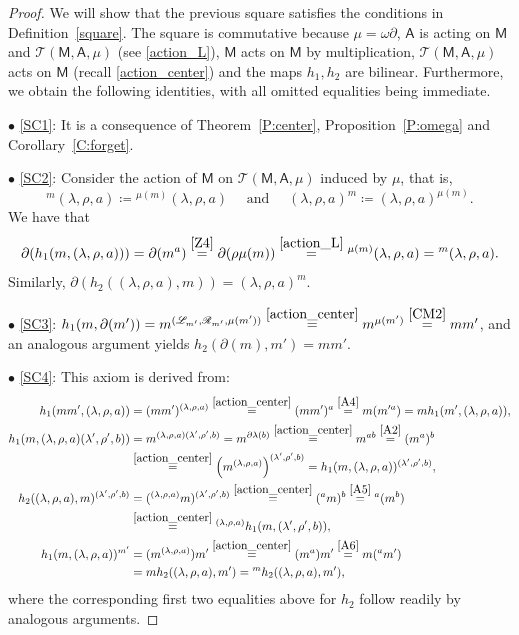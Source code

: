 \documentclass[12pt,reqno]{amsart}
\theoremstyle{plain}
\theoremstyle{definition}
\theoremstyle{remark}
\newcommand{\A}{\ensuremath{\mathsf{A}}}
\newcommand{\MM}{\ensuremath{\mathsf{M}}}
\newcommand{\T}{\ensuremath{\mathcal{T}}}
\newcommand{\LL}{\ensuremath{\mathcal{L}}}
\newcommand{\RR}{\ensuremath{\mathcal{R}}}
\numberwithin{equation}{section}
\begin{document}
\begin{proof}
	We will show that the previous square satisfies the conditions in Definition~\ref{square}.
    The square is commutative because $\mu= \omega \partial$, $\A$ is acting on $\MM$ and $\T(\MM,\A,\mu)$ (see \eqref{action_L}), $\MM$ acts on $\MM$ by multiplication, $\T(\MM,\A,\mu)$ acts on $\MM$ (recall \eqref{action_center}) and the maps $h_1,h_2$ are bilinear. Furthermore, we obtain the following identities, with all omitted equalities being immediate.
    
    $\bullet$ \eqref{SC1}: It is a consequence of Theorem~\ref{P:center}, Proposition~\ref{P:omega} and Corollary~\ref{C:forget}.

$\bullet$ \eqref{SC2}: Consider the action of $\MM$ on $\T(\MM,\A,\mu)$ induced by $\mu$, that is, 
\[{}^{m}(\lambda,\rho,a)\coloneqq{}^{\mu(m)}(\lambda,\rho,a) \quad
\text { and } \quad  (\lambda,\rho,a)^{m}\coloneqq(\lambda,\rho,a)^{\mu(m)}.\] 
    We have that 
		\[\partial(h_1(m,(\lambda,\rho,a)))=\partial(m^a)\stackrel{\eqref{Z4}}{=}\partial(\rho\mu(m))\stackrel{\eqref{action_L}}{=}{}^{\mu(m)}(\lambda,\rho,a)={}^{m}(\lambda,\rho,a).\]
   	Similarly, $\partial(h_2((\lambda,\rho,a),m))=(\lambda,\rho,a)^{m}$.
   	
$\bullet$ \eqref{SC3}: $h_1(m,\partial(m'))=m^{(\LL_{m'},\RR_{m'}, \mu(m'))}\stackrel{\eqref{action_center}}{=}m^{\mu(m')}\stackrel{\eqref{CM2}}{=}mm'$,  
 and an analogous argument yields $h_2(\partial(m),m')=mm'$.
	
$\bullet$ \eqref{SC4}: This axiom is derived from:
    \begin{align*}
		 h_1(mm', (\lambda, \rho, a))&= (mm')^{(\lambda, \rho, a)} \stackrel{\eqref{action_center}}{=} (mm')^{a}\stackrel{\eqref{A4}}{=} m(m'^{a})=mh_{1}(m',(\lambda,\rho,a)),\\
		 h_1(m, (\lambda, \rho, a)(\lambda', \rho', b)) &=m^{(\lambda, \rho, a)(\lambda', \rho', b)}=m^{\partial\lambda(b)}\stackrel{\eqref{action_center}}{=}m^{ab}\stackrel{\eqref{A2}}{=}(m^{a})^{b}\\
		 &\stackrel{\eqref{action_center}}{=} \left(m^{(\lambda, \rho, a)}\right)^{(\lambda', \rho', b)} =h_1(m, (\lambda, \rho, a))^{(\lambda', \rho', b)},\\
        h_2( (\lambda, \rho, a),m)^{(\lambda', \rho', b)} &=({}^{(\lambda, \rho, a)}m)^{(\lambda', \rho', b)}\stackrel{\eqref{action_center}}{=}({}^{a}m)^{b}\stackrel{\eqref{A5}}{=}{}^{a}(m^{b})\\
        & \stackrel{\eqref{action_center}}{=} {}^{(\lambda, \rho, a)}h_1( m,(\lambda', \rho', b)),  \\
        h_1(m, (\lambda, \rho, a))^{m'}&=  (m^{(\lambda, \rho, a)})m' 
        \stackrel{\eqref{action_center}}{=}(m^{a})m'  \stackrel{\eqref{A6}}{=} m({}^{a}m')\\
        &=mh_2( (\lambda, \rho, a),m')
        ={}^{m}h_2( (\lambda, \rho, a),m'),
	\end{align*}
	where the corresponding first two equalities above for $h_{2}$ follow readily by analogous arguments.


\end{proof}
\end{document}
